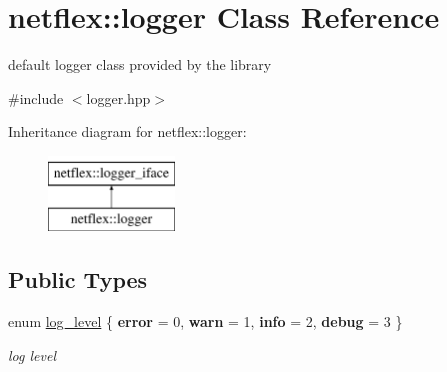 \hypertarget{classnetflex_1_1logger}{}\section{netflex\+:\+:logger Class Reference}
\label{classnetflex_1_1logger}


default logger class provided by the library  




{\ttfamily \#include $<$logger.\+hpp$>$}

Inheritance diagram for netflex\+:\+:logger\+:\begin{figure}[H]
\begin{center}
\leavevmode
\includegraphics[height=2.000000cm]{classnetflex_1_1logger}
\end{center}
\end{figure}
\subsection*{Public Types}
\begin{DoxyCompactItemize}
\item 
\mbox{\label{classnetflex_1_1logger_a8270276b1351480a8a9bfab4139cdc9c}} 
enum \hyperlink{classnetflex_1_1logger_a8270276b1351480a8a9bfab4139cdc9c}{log\+\_\+level} \{ {\bfseries error} = 0, 
{\bfseries warn} = 1, 
{\bfseries info} = 2, 
{\bfseries debug} = 3
 \}\begin{DoxyCompactList}\small\item\em log level \end{DoxyCompactList}
\end{DoxyCompactItemize}
